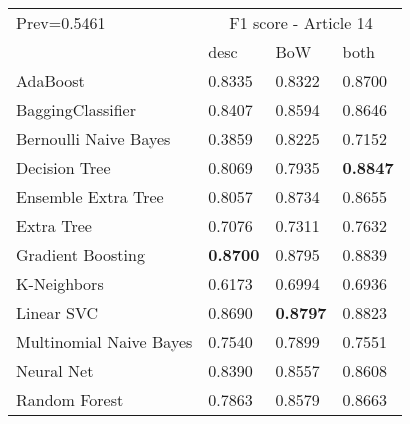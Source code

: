 \begin{tabular}{|l|l|l|l| }
\hline
Prev=0.5461 &  \multicolumn{3}{c|}{F1 score - Article 14} \\
\cline{2-4} & desc & BoW & both \\ \hline
AdaBoost                & 0.8335 & 0.8322 & 0.8700\\
BaggingClassifier       & 0.8407 & 0.8594 & 0.8646\\
Bernoulli Naive Bayes   & 0.3859 & 0.8225 & 0.7152\\
Decision Tree           & 0.8069 & 0.7935 & {\bf 0.8847}\\
Ensemble Extra Tree     & 0.8057 & 0.8734 & 0.8655\\
Extra Tree              & 0.7076 & 0.7311 & 0.7632\\
Gradient Boosting       & {\bf 0.8700} & 0.8795 & 0.8839\\
K-Neighbors             & 0.6173 & 0.6994 & 0.6936\\
Linear SVC              & 0.8690 & {\bf 0.8797} & 0.8823\\
Multinomial Naive Bayes & 0.7540 & 0.7899 & 0.7551\\
Neural Net              & 0.8390 & 0.8557 & 0.8608\\
Random Forest           & 0.7863 & 0.8579 & 0.8663\\
\hline
\end{tabular}
